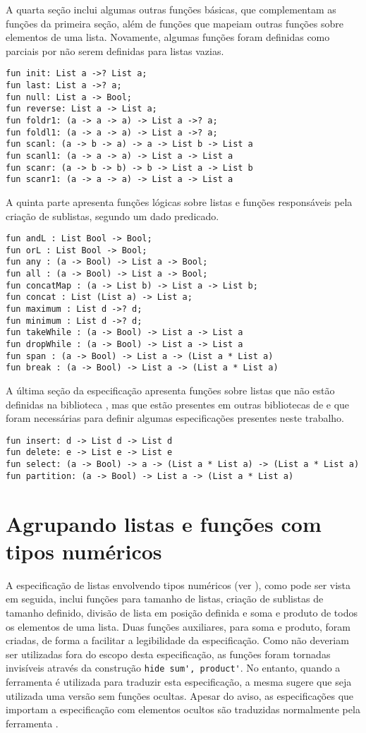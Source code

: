 A quarta seção inclui algumas outras funções básicas, que complementam as funções da primeira seção, além de funções que mapeiam outras funções sobre elementos de uma lista.
Novamente, algumas funções foram definidas como parciais por não serem definidas para listas vazias.
\begin{Verbatim}
fun init: List a ->? List a; 
fun last: List a ->? a; 
fun null: List a -> Bool; 
fun reverse: List a -> List a; 
fun foldr1: (a -> a -> a) -> List a ->? a; 
fun foldl1: (a -> a -> a) -> List a ->? a; 
fun scanl: (a -> b -> a) -> a -> List b -> List a 
fun scanl1: (a -> a -> a) -> List a -> List a 
fun scanr: (a -> b -> b) -> b -> List a -> List b 
fun scanr1: (a -> a -> a) -> List a -> List a 
\end{Verbatim}

A quinta parte apresenta funções lógicas sobre listas e funções responsáveis pela criação de sublistas, segundo um dado predicado.
\begin{Verbatim}
fun andL : List Bool -> Bool; 
fun orL : List Bool -> Bool; 
fun any : (a -> Bool) -> List a -> Bool; 
fun all : (a -> Bool) -> List a -> Bool; 
fun concatMap : (a -> List b) -> List a -> List b; 
fun concat : List (List a) -> List a; 
fun maximum : List d ->? d; 
fun minimum : List d ->? d; 
fun takeWhile : (a -> Bool) -> List a -> List a 
fun dropWhile : (a -> Bool) -> List a -> List a 
fun span : (a -> Bool) -> List a -> (List a * List a) 
fun break : (a -> Bool) -> List a -> (List a * List a) 
\end{Verbatim}

A última seção da especificação apresenta funções sobre listas que não estão definidas na biblioteca \Prelude, mas que estão presentes em outras bibliotecas de \Haskell e que foram necessárias para definir algumas especificações presentes neste trabalho.
\begin{Verbatim}
fun insert: d -> List d -> List d
fun delete: e -> List e -> List e
fun select: (a -> Bool) -> a -> (List a * List a) -> (List a * List a)
fun partition: (a -> Bool) -> List a -> (List a * List a)
\end{Verbatim}

\section{Agrupando listas e funções com tipos numéricos}
A especificação de listas envolvendo tipos numéricos (ver ), como pode ser vista em seguida, inclui funções para tamanho de listas, criação de sublistas de tamanho definido, divisão de lista em posição definida e soma e produto de todos os elementos de uma lista.
Duas funções auxiliares, para soma e produto, foram criadas, de forma a facilitar a legibilidade da especificação.
Como não deveriam ser utilizadas fora do escopo desta especificação, as funções foram tornadas invisíveis através da construção \Verb.hide sum', product'..
No entanto, quando a ferramenta \Hets é utilizada para traduzir esta especificação, a mesma sugere que seja utilizada uma versão sem funções ocultas.
Apesar do aviso, as especificações que importam a especificação com elementos ocultos são traduzidas normalmente pela ferramenta \Hets.

